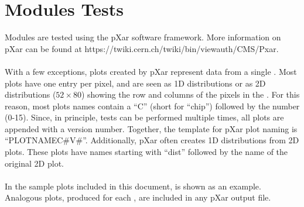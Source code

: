 \section{Modules Tests}
\label{s:tests}

Modules are tested using the pXar software framework.  
More information on pXar can be found at https://twiki.cern.ch/twiki/bin/viewauth/CMS/Pxar.
\\\\
With a few exceptions, plots created by pXar represent data from a single \roc.
Most \roc plots have one entry per pixel, and are seen as 1D distributions
or as 2D distributions ($52\times80$) showing the row and columns of the pixels in the \roc.
For this reason, most plots names contain a ``C'' (short for ``chip'') followed by the  \roc number (0-15).
Since, in principle, tests can be performed multiple times, all plots are appended with a version number.
Together, the template for pXar plot naming is ``PLOT\textunderscore NAME\textunderscore C\#\textunderscore V\#''.
Additionally, pXar often creates 1D distributions from 2D \roc plots.  
These plots have names starting with ``dist\textunderscore'' followed by the name of the original 2D plot.
\\\\
In the sample plots included in this document,  is shown as an example.
Analogous plots, produced for each \roc, are included in any pXar output file.





















